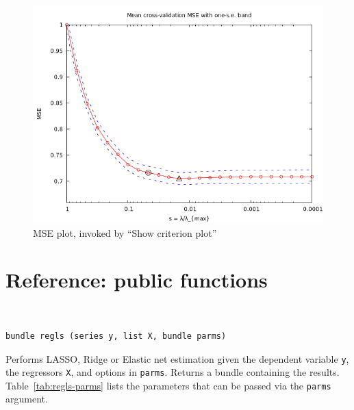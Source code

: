 \documentclass{article}
\newenvironment{funcdoc}
{\noindent\hrulefill\\[-12pt]}
{\medbreak}
\begin{document}
\begin{figure}[htbp]
  \begin{center}
  \includegraphics[scale=0.5]{mse_plot}
  \caption{MSE plot, invoked by ``Show criterion plot''}
  \label{fig:mse-plot}
  \end{center}
\end{figure}

\clearpage

\section{Reference: public functions}
\label{sec:funcref}

\begin{funcdoc}
\begin{verbatim}
bundle regls (series y, list X, bundle parms)
\end{verbatim}
  Performs LASSO, Ridge or Elastic net estimation given the dependent
  variable \texttt{y}, the regressors \texttt{X}, and options in
  \texttt{parms}. Returns a bundle containing the
  results. Table~\ref{tab:regls-parms} lists the parameters that can
  be passed via the \texttt{parms} argument.
\end{funcdoc}
\end{document}
